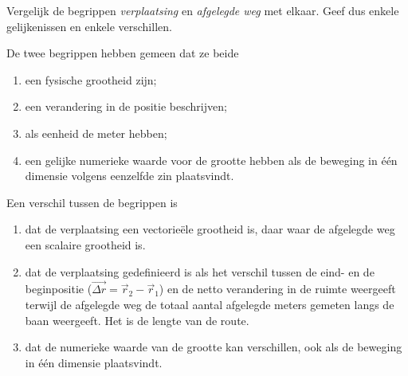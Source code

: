 \documentclass{ximera}
\begin{document}
\begin{exercise}

 Vergelijk de begrippen \emph{verplaatsing} en \emph{afgelegde weg} met elkaar. Geef dus enkele gelijkenissen en enkele verschillen. 

 \begin{oplossing}
De twee begrippen hebben gemeen dat ze beide 
\begin{enumerate}
	\item een fysische grootheid zijn;
	\item een verandering in de positie beschrijven;
	\item als eenheid de meter hebben;
	\item een gelijke numerieke waarde voor de grootte hebben als de beweging in \'e\'en dimensie volgens eenzelfde zin plaatsvindt.
\end{enumerate}

Een verschil tussen de begrippen is

\begin{enumerate}
	\item dat de verplaatsing een vectorie\"ele grootheid is, daar waar de afgelegde weg een scalaire grootheid is. 
	\item dat de verplaatsing gedefinieerd is als het verschil tussen de eind- en de beginpositie ($\vec{\Delta r}=\vec{r}_2-\vec{r}_1$) en de netto verandering in de ruimte weergeeft terwijl de afgelegde weg de totaal aantal afgelegde meters gemeten langs de baan weergeeft. Het is de lengte van de route.
	\item dat de numerieke waarde van de grootte kan verschillen, ook als de beweging in \'e\'en dimensie plaatsvindt.
\end{enumerate}

\end{oplossing}

\end{exercise}
\end{document}
